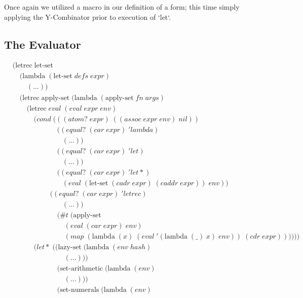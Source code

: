 Once again we utilized a macro in our definition of a form; this time simply
applying the Y-Combinator prior to execution of `let`.

\subsection{The Evaluator}
\begin{align*}
& (\text{letrec} \; \text{let-set} \; 
\\& \quad (\text{lambda} \; (\text{let-set} \; defs \; expr)
\\& \qquad (\dots))
\\& \quad (\text{letrec} \; \text{apply-set} \; (\text{lambda} \; (\text{apply-set} \; fn \; args)
\\& \qquad (\text{letrec} \; eval \; (eval \; expr \; env)
\\& \qquad \quad (cond \; (((atom? \; expr) \; ((assoc \; expr \; env) \; nil))
\\& \qquad \qquad \qquad \; ((equal? \; (car \; expr) \; 'lambda) \; 
\\& \qquad \qquad \qquad \quad (\dots))
\\& \qquad \qquad \qquad \; ((equal? \; (car \; expr) \; 'let)
\\& \qquad \qquad \qquad \quad (\dots))
\\& \qquad \qquad \qquad \; ((equal? \; (car \; expr) \; 'let*) \; 
\\& \qquad \qquad \qquad \quad (eval \; (\text{let-set} \; (cadr \; expr) \; (caddr \; expr)) \; env))
\\& \qquad \qquad \quad \; ((equal? \; (car \; expr) \; 'letrec)
\\& \qquad \qquad \qquad \quad (\dots))
\\& \qquad \qquad \qquad \; (\#t \; (\text{apply-set} \; 
\\& \qquad \qquad \qquad \quad \; (eval \; (car \; expr) \; env) \; 
\\& \qquad \qquad \qquad \quad \; (map \; (\text{lambda} \; (x) \; (eval \; '(\text{lambda} \; (\_) \; x) \; env)) \; (cdr \; expr))))))
\\& \qquad \quad (let* \; ((\text{lazy-set} \; (\text{lambda} \; (env \; hash)
\\& \qquad \qquad \qquad \quad \; (\dots)))
\\& \qquad \qquad \qquad \; (\text{set-arithmetic} \; (\text{lambda} \; (env)
\\& \qquad \qquad \qquad \quad \; (\dots)))
\\& \qquad \qquad \qquad \; (\text{set-numerals} \; (\text{lambda} \; (env)

\end{align*}
